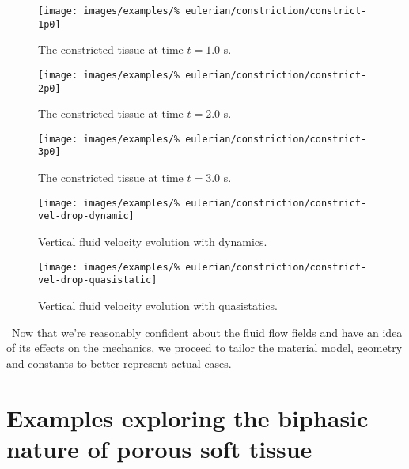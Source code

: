 \begin{figure}[!hptb]
\centering
\texttt{[image: images/examples/\%
eulerian/constriction/constrict-1p0]}
\caption{The constricted tissue at time $t=1.0$ s.} 
\label{constrict-image-1p0}
\end{figure}

\begin{figure}[!hptb]
\centering
\texttt{[image: images/examples/\%
eulerian/constriction/constrict-2p0]}
\caption{The constricted tissue at time $t=2.0$ s.} 
\label{constrict-image-2p0}
\end{figure}

\begin{figure}[!hptb]
\centering
\texttt{[image: images/examples/\%
eulerian/constriction/constrict-3p0]}
\caption{The constricted tissue at time $t=3.0$ s.} 
\label{constrict-image-3p0}
\end{figure}

\begin{figure}[!hptb]
\centering
\texttt{[image: images/examples/\%
eulerian/constriction/constrict-vel-drop-dynamic]}
\caption{Vertical fluid velocity evolution with dynamics.} 
\label{velocity-evolution-dynamic}
\end{figure}

\begin{figure}[!hptb]
\centering
\texttt{[image: images/examples/\%
eulerian/constriction/constrict-vel-drop-quasistatic]}
\caption{Vertical fluid velocity evolution with quasistatics.} 
\label{velocity-evolution-quasistatic}
\end{figure}

\clearpage

\textbullet\ Now that we're reasonably confident about the fluid flow
fields and have an idea of its effects on the mechanics, we proceed to
tailor the material model, geometry and constants to better represent
actual cases.

\section{Examples exploring the biphasic nature of porous soft tissue}
\label{biphasic-examples-2}


